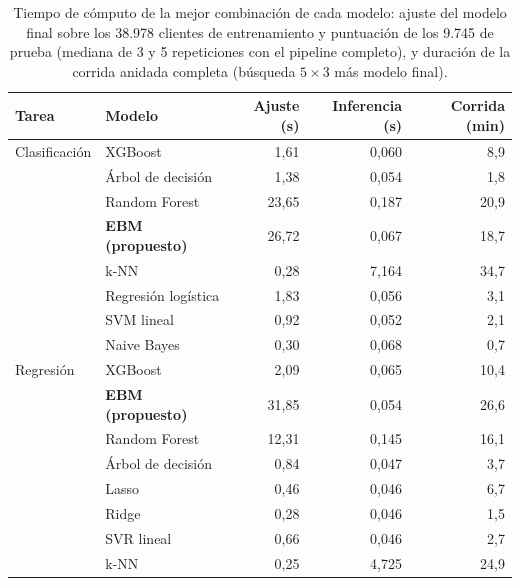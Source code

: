 \begin{table}[htbp]
\caption{Tiempo de cómputo de la mejor combinación de cada modelo: ajuste del modelo final sobre los 38.978 clientes de entrenamiento y puntuación de los 9.745 de prueba (mediana de 3 y 5 repeticiones con el pipeline completo), y duración de la corrida anidada completa (búsqueda $5\times3$ más modelo final).}\label{tab:tiempos}
\scriptsize\setlength{\tabcolsep}{2pt}
\begin{tabular}{llrrr}
\toprule
\textbf{Tarea} & \textbf{Modelo} & \textbf{Ajuste (s)} & \textbf{Inferencia (s)} & \textbf{Corrida (min)} \\
\midrule
Clasificación & XGBoost & 1,61 & 0,060 & 8,9 \\
 & Árbol de decisión & 1,38 & 0,054 & 1,8 \\
 & Random Forest & 23,65 & 0,187 & 20,9 \\
 & \textbf{EBM (propuesto)} & 26,72 & 0,067 & 18,7 \\
 & k-NN & 0,28 & 7,164 & 34,7 \\
 & Regresión logística & 1,83 & 0,056 & 3,1 \\
 & SVM lineal & 0,92 & 0,052 & 2,1 \\
 & Naive Bayes & 0,30 & 0,068 & 0,7 \\
Regresión & XGBoost & 2,09 & 0,065 & 10,4 \\
 & \textbf{EBM (propuesto)} & 31,85 & 0,054 & 26,6 \\
 & Random Forest & 12,31 & 0,145 & 16,1 \\
 & Árbol de decisión & 0,84 & 0,047 & 3,7 \\
 & Lasso & 0,46 & 0,046 & 6,7 \\
 & Ridge & 0,28 & 0,046 & 1,5 \\
 & SVR lineal & 0,66 & 0,046 & 2,7 \\
 & k-NN & 0,25 & 4,725 & 24,9 \\
\bottomrule
\end{tabular}
\end{table}
